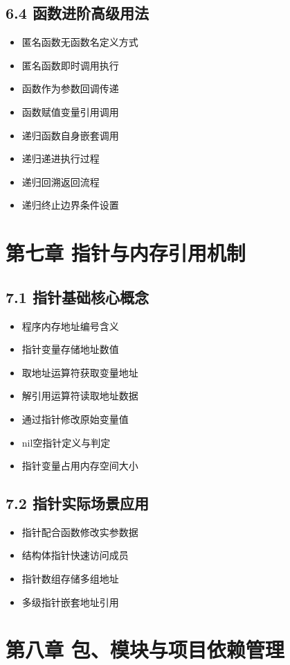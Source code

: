 \subsection{6.4 函数进阶高级用法}
\begin{itemize}
\item 匿名函数无函数名定义方式
\item 匿名函数即时调用执行
\item 函数作为参数回调传递
\item 函数赋值变量引用调用
\item 递归函数自身嵌套调用
\item 递归递进执行过程
\item 递归回溯返回流程
\item 递归终止边界条件设置
\end{itemize}

\section{第七章 指针与内存引用机制}
\subsection{7.1 指针基础核心概念}
\begin{itemize}
\item 程序内存地址编号含义
\item 指针变量存储地址数值
\item 取地址运算符获取变量地址
\item 解引用运算符读取地址数据
\item 通过指针修改原始变量值
\item nil空指针定义与判定
\item 指针变量占用内存空间大小
\end{itemize}

\subsection{7.2 指针实际场景应用}
\begin{itemize}
\item 指针配合函数修改实参数据
\item 结构体指针快速访问成员
\item 指针数组存储多组地址
\item 多级指针嵌套地址引用
\end{itemize}

\section{第八章 包、模块与项目依赖管理}
